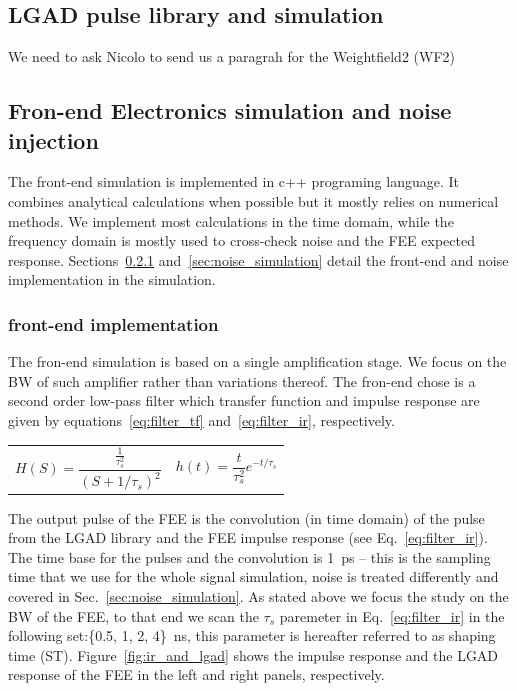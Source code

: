 \documentclass[preprint,1p]{elsarticle}
\begin{document}
\subsection{LGAD pulse library and simulation}
\label{sub_sec:lgad_pulse_library}
We need to ask Nicolo to send us a paragrah for the Weightfield2 (WF2)

\subsection{Fron-end Electronics simulation and noise injection}
\label{sub_sec:fee_simulation_and_noise}
The front-end simulation is implemented in c++ programing language. It combines analytical calculations when possible but
it mostly relies on numerical methods. We implement most calculations in the time domain, while the frequency domain is mostly used
to cross-check noise and the FEE expected response. Sections~\ref{sec:fee} and~\ref{sec:noise_simulation} detail the front-end and
noise implementation in the simulation.

\subsubsection{front-end implementation}\label{sec:fee}
The fron-end simulation is based on a single amplification stage. We focus on the BW of such amplifier rather than variations
thereof. The fron-end chose is a second order low-pass filter which transfer function
and impulse response are given by equations~\ref{eq:filter_tf} and~\ref{eq:filter_ir}, respectively.


 \begin{tabularx}{\textwidth}{XX}
 \begin{equation}\label{eq:filter_tf}
   H(S) = \frac{\frac{1}{\tau_{s}^{2}}}{(S+1/\tau_{s})^{2}}
 \end{equation}
     &
 \begin{equation}\label{eq:filter_ir}
     h(t) = \frac{t}{\tau_s^2}e^{-t/\tau_{s}}
 \end{equation}
 \end{tabularx}\par

 The output pulse of the FEE is the convolution (in time domain) of the pulse from the LGAD library and the FEE impulse response
 (see Eq.~\ref{eq:filter_ir}).
 The time base for the pulses and the convolution is 1~\si{ps} -- this is the sampling time that we use for the whole
 signal simulation, noise is treated differently and covered in Sec.~\ref{sec:noise_simulation}. As stated above we focus the study
 on the BW of the FEE, to that end we scan the $\tau_{s}$ paremeter in Eq.~\ref{eq:filter_ir} in the following set:\{0.5, 1, 2, 4\}~\si{ns}, this parameter is hereafter referred to as
 shaping time (ST). Figure~\ref{fig:ir_and_lgad} shows the impulse response and the LGAD response of the FEE in the left and right panels,
 respectively.
\end{document}
